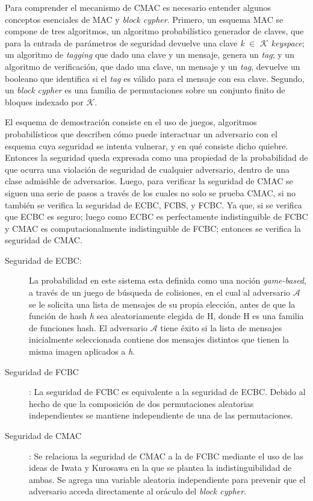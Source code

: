 \documentclass[runningheads]{llncs}
\begin{document}
Para comprender el mecanismo de CMAC es necesario entender algunos conceptos esenciales de MAC y \textit{block cypher}. Primero, un esquema MAC se compone de tres algoritmos, un algoritmo probabilístico generador de claves, que para la entrada de parámetros de seguridad devuelve una clave \textit{k} $\in$ $\mathcal{K}$ \textit{keyspace}; un algoritmo de \textit{tagging} que dado una clave y un mensaje, genera un \textit{tag}; y un algoritmo de verificación, que dado una clave, un mensaje y un \textit{tag}, devuelve un booleano que identifica si el \textit{tag} es válido para el mensaje con esa clave. Segundo, un \textit{block cypher} es una familia de permutaciones sobre un conjunto finito de bloques indexado por $\mathcal{K}$.

El esquema de demostración consiste en el uso de juegos, algoritmos probabilísticos que describen cómo puede interactuar un adversario con el esquema cuya seguridad se intenta vulnerar, y en qué consiste dicho quiebre. Entonces la seguridad queda expresada como una propiedad de la probabilidad de que ocurra una violación de seguridad de cualquier adversario, dentro de una clase admisible de adversarios. Luego, para verificar la seguridad de CMAC se siguen una serie de pasos a través de los cuales no solo se prueba CMAC, si no también se verifica la seguridad de ECBC, FCBS, y FCBC. Ya que, si se verifica que ECBC es seguro; luego como ECBC es perfectamente indistinguible de FCBC y CMAC es computacionalmente indistinguible de FCBC; entonces se verifica la seguridad de CMAC.

\begin{description}
\item[Seguridad de ECBC:] La probabilidad en este sistema esta definida como una noción \textit{game-based}, a través de un juego de búsqueda de colisiones, en el cual al adversario $\mathcal{A}$ se le solicita una lista de mensajes de su propia elección, antes de que la función de hash \textit{h} sea aleatoriamente elegida de H, donde H es una familia de funciones hash. El adversario $\mathcal{A}$ tiene éxito si la lista de mensajes inicialmente seleccionada contiene dos mensajes distintos que tienen la misma imagen aplicados a \textit{h}.

\item[Seguridad de FCBC]: La seguridad de FCBC es equivalente a la seguridad de ECBC. Debido al hecho de que la composición de dos permutaciones aleatorias independientes se mantiene independiente de una de las permutaciones.

\item[Seguridad de CMAC]: Se relaciona la seguridad de CMAC a la de FCBC mediante el uso de las ideas de Iwata y Kurosawa en la que se plantea la indistinguibilidad de ambas. Se agrega una variable aleatoria independiente para prevenir que el adversario acceda directamente al oráculo del \textit{block cypher}.
\end{description}
\end{document}
